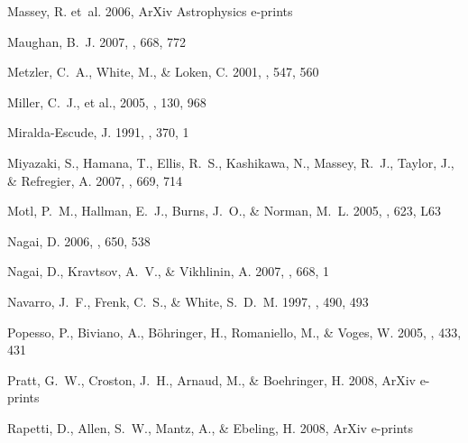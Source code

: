 \documentclass[12pt]{emulateapj}
\begin{document}
\begin{thebibliography}{111}
{Massey}, R. {et~al.} 2006, ArXiv Astrophysics e-prints

{Maughan}, B.~J. 2007, \apj, 668, 772

{Metzler}, C.~A., {White}, M., \& {Loken}, C. 2001, \apj, 547, 560

{Miller}, C.~J., et al., 2005, \aj,
  130, 968

{Miralda-Escude}, J. 1991, \apj, 370, 1

{Miyazaki}, S., {Hamana}, T., {Ellis}, R.~S., {Kashikawa}, N., {Massey}, R.~J.,
  {Taylor}, J., \& {Refregier}, A. 2007, \apj, 669, 714

{Motl}, P.~M., {Hallman}, E.~J., {Burns}, J.~O., \& {Norman}, M.~L. 2005,
  \apjl, 623, L63

{Nagai}, D. 2006, \apj, 650, 538

{Nagai}, D., {Kravtsov}, A.~V., \& {Vikhlinin}, A. 2007, \apj, 668, 1

{Navarro}, J.~F., {Frenk}, C.~S., \& {White}, S.~D.~M. 1997, \apj, 490, 493

{Popesso}, P., {Biviano}, A., {B{\"o}hringer}, H., {Romaniello}, M., \&
  {Voges}, W. 2005, \aap, 433, 431

{Pratt}, G.~W., {Croston}, J.~H., {Arnaud}, M., \& {Boehringer}, H. 2008, ArXiv
  e-prints

{Rapetti}, D., {Allen}, S.~W., {Mantz}, A., \& {Ebeling}, H. 2008, ArXiv
  e-prints


\end{thebibliography}
\end{document}
